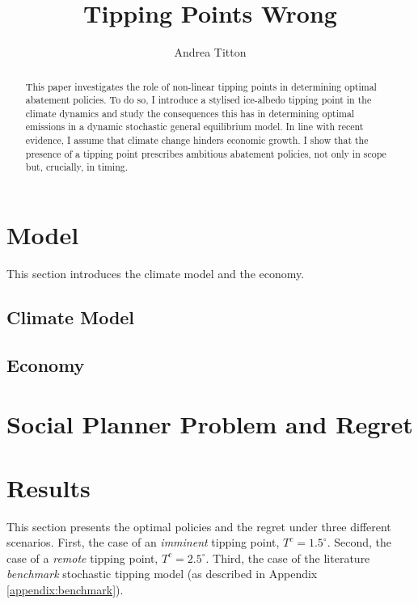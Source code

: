 \documentclass[12pt]{article}
\author{Andrea Titton}
\title{Tipping Points Wrong}
\begin{document}
\maketitle

\begin{abstract}
  This paper investigates the role of non-linear tipping points in determining optimal abatement policies. To do so, I introduce a stylised ice-albedo tipping point in the climate dynamics and study the consequences this has in determining optimal emissions in a dynamic stochastic general equilibrium model. In line with recent evidence, I assume that climate change hinders economic growth. I show that the presence of a tipping point prescribes ambitious abatement policies, not only in scope but, crucially, in timing.
\end{abstract}

\newpage


\section{Model}

This section introduces the climate model and the economy.

\subsection{Climate Model}



\subsection{Economy}




\section{Social Planner Problem and Regret}



\section{Results}

This section presents the optimal policies and the regret under three different scenarios. First, the case of an \textit{imminent} tipping point, $T^c = 1.5^{\circ}$. Second, the case of a \textit{remote} tipping point, $T^c = 2.5^{\circ}$. Third, the case of the literature \textit{benchmark} stochastic tipping model (as described in Appendix \ref{appendix:benchmark}).
\end{document}
